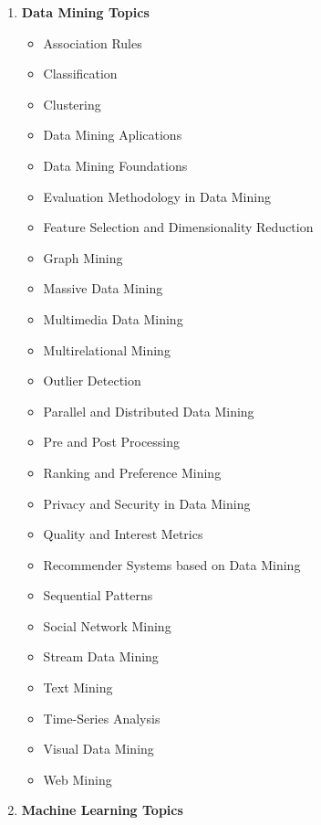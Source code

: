 \documentclass[kdmile,a4paper]{kdmile} %
\begin{document}
\begin{enumerate}
\item \textbf{Data Mining Topics}

\begin{itemize}
\item Association Rules
\item Classification
\item Clustering
\item Data Mining Aplications
\item Data Mining Foundations
\item Evaluation Methodology in Data Mining
\item Feature Selection and Dimensionality Reduction
\item Graph Mining
\item Massive Data Mining
\item Multimedia Data Mining
\item Multirelational Mining
\item Outlier Detection
\item Parallel and Distributed Data Mining
\item Pre and Post Processing
\item Ranking and Preference Mining
\item Privacy and Security in Data Mining
\item Quality and Interest Metrics
\item Recommender Systems based on Data Mining
\item Sequential Patterns
\item Social Network Mining
\item Stream Data Mining
\item Text Mining
\item Time-Series Analysis
\item Visual Data Mining
\item Web Mining
\end{itemize}

\item \textbf{Machine Learning Topics}


\end{enumerate}
\end{document}
